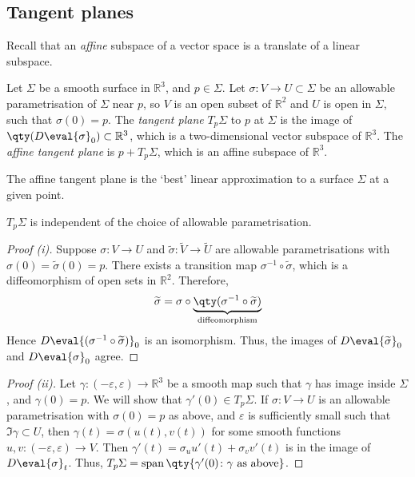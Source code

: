 \subsection{Tangent planes}
Recall that an \textit{affine} subspace of a vector space is a translate of a linear subspace.
\begin{definition}
	Let $\Sigma$ be a smooth surface in $\mathbb R^3$, and $p \in \Sigma$.
	Let $\sigma \colon V \to U \subset \Sigma$ be an allowable parametrisation of $\Sigma$ near $p$, so $V$ is an open subset of $\mathbb R^2$ and $U$ is open in $\Sigma$, such that $\sigma(0) = p$.
	The \textit{tangent plane} $T_p \Sigma$ to $p$ at $\Sigma$ is the image of $\qty(D \eval{\sigma}_0) \subset \mathbb R^3$, which is a two-dimensional vector subspace of $\mathbb R^3$.
	The \textit{affine tangent plane} is $p + T_p \Sigma$, which is an affine subspace of $\mathbb R^3$.
\end{definition}
\begin{remark}
	The affine tangent plane is the `best' linear approximation to a surface $\Sigma$ at a given point.
\end{remark}
\begin{lemma}
	$T_p \Sigma$ is independent of the choice of allowable parametrisation.
\end{lemma}
\begin{proof}[Proof (i)]
	Suppose $\sigma \colon V \to U$ and $\widetilde \sigma \colon \widetilde V \to \widetilde U$ are allowable parametrisations with $\sigma(0) = \widetilde \sigma(0) = p$.
	There exists a transition map $\sigma^{-1} \circ \widetilde \sigma$, which is a diffeomorphism of open sets in $\mathbb R^2$.
	Therefore,
	\begin{align*}
		\widetilde \sigma = \sigma \circ \underbrace{\qty(\sigma^{-1} \circ \widetilde \sigma)}_{\text{diffeomorphism}}
	\end{align*}
	Hence $D\eval{(\sigma^{-1} \circ \widetilde \sigma)}_{0}$ is an isomorphism.
	Thus, the images of $D \eval{\widetilde \sigma}_0$ and $D \eval{\sigma}_0$ agree.
\end{proof}
\begin{proof}[Proof (ii)]
	Let $\gamma \colon (-\varepsilon, \varepsilon) \to \mathbb R^3$ be a smooth map such that $\gamma$ has image inside $\Sigma$, and $\gamma(0) = p$.
	We will show that $\gamma'(0) \in T_p \Sigma$.
	If $\sigma \colon V \to U$ is an allowable parametrisation with $\sigma(0) = p$ as above, and $\varepsilon$ is sufficiently small such that $\Im \gamma \subset U$, then $\gamma(t) = \sigma(u(t), v(t))$ for some smooth functions $u, v \colon (-\varepsilon, \varepsilon) \to V$.
	Then $\gamma'(t) = \sigma_u u'(t) + \sigma_v v'(t)$ is in the image of $D \eval{\sigma}_t$.
	Thus, $T_p \Sigma = \vecspan \qty{ \gamma'(0) \colon \gamma \text{ as above} }$.
\end{proof}
